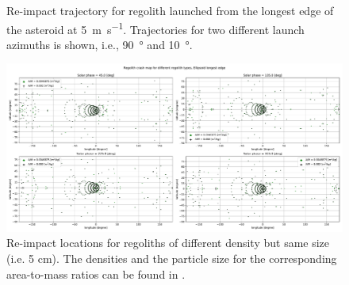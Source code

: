 \documentclass[print]{tudelft-report}
\begin{document}
\begin{appendices}
\begin{figure}[htb]
    \caption{Re-impact trajectory for regolith launched from the longest edge of the asteroid at \SI{5}{\metre\per\second}. Trajectories for two different launch azimuths is shown, i.e., \SI{90}{\degree} and \SI{10}{\degree}.}
    \label{fig:5ms_traj_90and10_azim_noSP}
    \end{figure}
    \FloatBarrier
    \begin{figure}[htb]
    \centering
    \captionsetup{justification=centering}
    \includegraphics[angle=90, width=\textwidth, height=\textheight, keepaspectratio=true]{Results/Images/longest_edge_perturbations/multiple_regolith_types/allPhases_crashMap_3P2_7P5_density_5cm_Radius.pdf}
    \caption{Re-impact locations for regoliths of different density but same size (i.e. 5 cm). The densities and the particle size for the corresponding area-to-mass ratios can be found in .}
    \label{fig:crashmap_3.2_7.5_density_5cmRadius}
    \end{figure}
    \FloatBarrier
    \begin{figure}[htb]
    \centering
    \captionsetup{justification=centering}

\end{figure}
\end{appendices}
\end{document}

